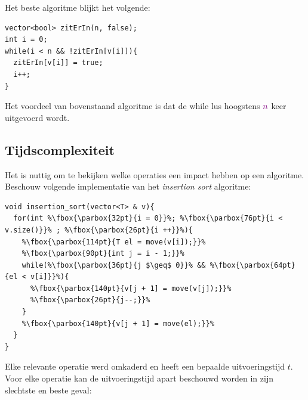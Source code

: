 \documentclass[12pt]{report}
\newcommand{\note}[1]{
  \color{violet}#1 \color{black}
}
\begin{document}
Het beste algoritme blijkt het volgende:
\begin{lstlisting}
vector<bool> zitErIn(n, false);
int i = 0;
while(i < n && !zitErIn[v[i]]){
  zitErIn[v[i]] = true;
  i++;
}
\end{lstlisting}
Het voordeel van bovenstaand algoritme is dat de while lus hoogstens $\note{n}$ keer uitgevoerd wordt.

\subsection{Tijdscomplexiteit}
Het is nuttig om te bekijken welke operaties een impact hebben op een algoritme. Beschouw volgende implementatie van het \textit{insertion sort} algoritme:

\begin{lstlisting}[escapechar=\%]
void insertion_sort(vector<T> & v){
  for(int %\fbox{\parbox{32pt}{i = 0}}%; %\fbox{\parbox{76pt}{i < v.size()}}% ; %\fbox{\parbox{26pt}{i ++}}%){
    %\fbox{\parbox{114pt}{T el = move(v[i]);}}%
    %\fbox{\parbox{90pt}{int j = i - 1;}}%
    while(%\fbox{\parbox{36pt}{j $\geq$ 0}}% && %\fbox{\parbox{64pt}{el < v[i]}}%){
      %\fbox{\parbox{140pt}{v[j + 1] = move(v[j]);}}%
      %\fbox{\parbox{26pt}{j--;}}%
    }
    %\fbox{\parbox{140pt}{v[j + 1] = move(el);}}%
  }
}
\end{lstlisting}
Elke relevante operatie werd omkaderd en heeft een bepaalde uitvoeringstijd $t$. Voor elke operatie kan de uitvoeringstijd apart beschouwd worden in zijn slechtste en beste geval:
\end{document}
